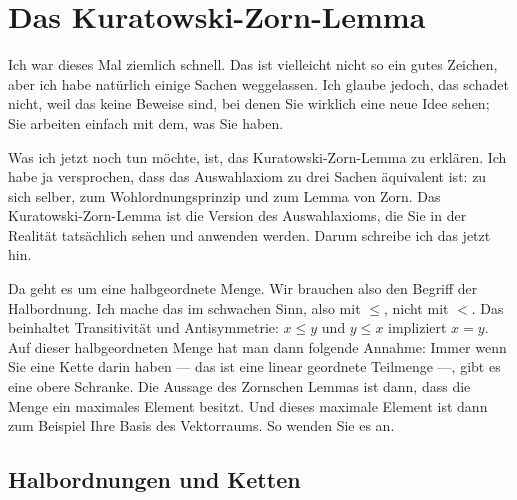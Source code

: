 \begin{ai-global-state-checkpoint-invisible-content}
\end{ai-global-state-checkpoint-invisible-content}

\section{Das Kuratowski-Zorn-Lemma}

\begin{spoken-clean}[00:54:40 - 00:56:40]
Ich war dieses Mal ziemlich schnell. Das ist vielleicht nicht so ein gutes Zeichen, aber ich habe natürlich einige Sachen weggelassen. Ich glaube jedoch, das schadet nicht, weil das keine Beweise sind, bei denen Sie wirklich eine neue Idee sehen; Sie arbeiten einfach mit dem, was Sie haben. 

Was ich jetzt noch tun möchte, ist, das Kuratowski-Zorn-Lemma zu erklären. Ich habe ja versprochen, dass das Auswahlaxiom zu drei Sachen äquivalent ist: zu sich selber, zum Wohlordnungsprinzip und zum Lemma von Zorn. Das Kuratowski-Zorn-Lemma ist die Version des Auswahlaxioms, die Sie in der Realität tatsächlich sehen und anwenden werden. Darum schreibe ich das jetzt hin.

Da geht es um eine halbgeordnete Menge. Wir brauchen also den Begriff der Halbordnung. Ich mache das im schwachen Sinn, also mit $\le$, nicht mit $<$. Das beinhaltet Transitivität und Antisymmetrie: $x \le y$ und $y \le x$ impliziert $x = y$. Auf dieser halbgeordneten Menge hat man dann folgende Annahme: Immer wenn Sie eine Kette darin haben --- das ist eine linear geordnete Teilmenge ---, gibt es eine obere Schranke. Die Aussage des Zornschen Lemmas ist dann, dass die Menge ein maximales Element besitzt. Und dieses maximale Element ist dann zum Beispiel Ihre Basis des Vektorraums. So wenden Sie es an.
\end{spoken-clean}

\subsection{Halbordnungen und Ketten}

